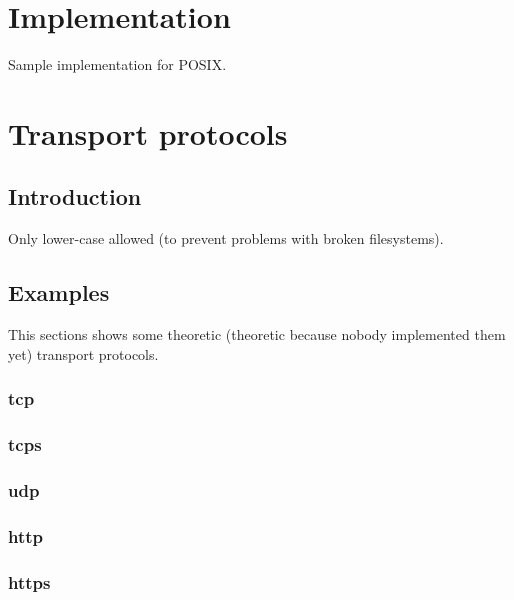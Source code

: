 \documentclass[12pt,a4paper]{book}
\begin{document}
\chapter{Implementation}
Sample implementation for POSIX.

\chapter{Transport protocols}
\section{Introduction}
Only lower-case allowed (to prevent problems with broken filesystems).
\section{Examples}
This sections shows some theoretic (theoretic because nobody implemented
them yet) transport protocols.
\subsection{tcp}
\subsection{tcps}
\subsection{udp}
\subsection{http}
\subsection{https}
\end{document}
